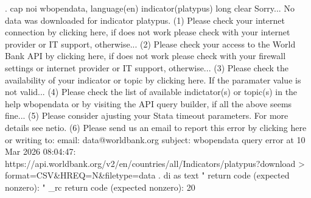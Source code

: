 . cap noi wbopendata, language(en) indicator(platypus) long clear
{\smallskip}
    Sorry... No data was downloaded for indicator platypus.
{\smallskip}
    (1) Please check your internet connection by clicking here, if does not
    work please check with your internet provider or IT support, otherwise...
    (2) Please check your access to the World Bank API by clicking here, if
    does not work please check with your firewall settings or internet
    provider or IT support, otherwise...
    (3) Please check the availability of your indicator or topic by clicking
    here. If the paramater value is not valid...
    (4) Please check the list of available indictator(s) or topic(s) in the
    help wbopendata or by visiting the API query builder, if all the above
    seems fine...
    (5) Please consider ajusting your Stata timeout parameters. For more
    details see netio.
    (6) Please send us an email to report this error by clicking here or
    writing to:
            email: data@worldbank.org
            subject: wbopendata query error at 10 Mar 2026 08:04:47:
    https://api.worldbank.org/v2/en/countries/all/Indicators/platypus?download
    > format=CSV\&HREQ=N\&filetype=data
{\smallskip}
{\smallskip}
{\smallskip}
. di as text "  return code (expected nonzero): " _rc
  return code (expected nonzero): 20
